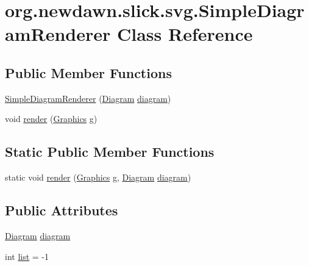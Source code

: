 \hypertarget{classorg_1_1newdawn_1_1slick_1_1svg_1_1_simple_diagram_renderer}{}\section{org.\+newdawn.\+slick.\+svg.\+Simple\+Diagram\+Renderer Class Reference}
\label{classorg_1_1newdawn_1_1slick_1_1svg_1_1_simple_diagram_renderer}
\subsection*{Public Member Functions}
\begin{DoxyCompactItemize}
\item 
\mbox{\hyperlink{classorg_1_1newdawn_1_1slick_1_1svg_1_1_simple_diagram_renderer_a37e21a052f321aa7c91c9c5420adc8c9}{Simple\+Diagram\+Renderer}} (\mbox{\hyperlink{classorg_1_1newdawn_1_1slick_1_1svg_1_1_diagram}{Diagram}} \mbox{\hyperlink{classorg_1_1newdawn_1_1slick_1_1svg_1_1_simple_diagram_renderer_a2b56dad891d98b19da92cd43376e02e8}{diagram}})
\item 
void \mbox{\hyperlink{classorg_1_1newdawn_1_1slick_1_1svg_1_1_simple_diagram_renderer_a96e551c2437df27242c43353a85bd8ec}{render}} (\mbox{\hyperlink{classorg_1_1newdawn_1_1slick_1_1_graphics}{Graphics}} g)
\end{DoxyCompactItemize}
\subsection*{Static Public Member Functions}
\begin{DoxyCompactItemize}
\item 
static void \mbox{\hyperlink{classorg_1_1newdawn_1_1slick_1_1svg_1_1_simple_diagram_renderer_a33c25d60d0c42f10d7bac023cd8bb312}{render}} (\mbox{\hyperlink{classorg_1_1newdawn_1_1slick_1_1_graphics}{Graphics}} g, \mbox{\hyperlink{classorg_1_1newdawn_1_1slick_1_1svg_1_1_diagram}{Diagram}} \mbox{\hyperlink{classorg_1_1newdawn_1_1slick_1_1svg_1_1_simple_diagram_renderer_a2b56dad891d98b19da92cd43376e02e8}{diagram}})
\end{DoxyCompactItemize}
\subsection*{Public Attributes}
\begin{DoxyCompactItemize}
\item 
\mbox{\hyperlink{classorg_1_1newdawn_1_1slick_1_1svg_1_1_diagram}{Diagram}} \mbox{\hyperlink{classorg_1_1newdawn_1_1slick_1_1svg_1_1_simple_diagram_renderer_a2b56dad891d98b19da92cd43376e02e8}{diagram}}
\item 
int \mbox{\hyperlink{classorg_1_1newdawn_1_1slick_1_1svg_1_1_simple_diagram_renderer_a48000603b4c3624a604096f01f5d58d0}{list}} = -\/1
\end{DoxyCompactItemize}
